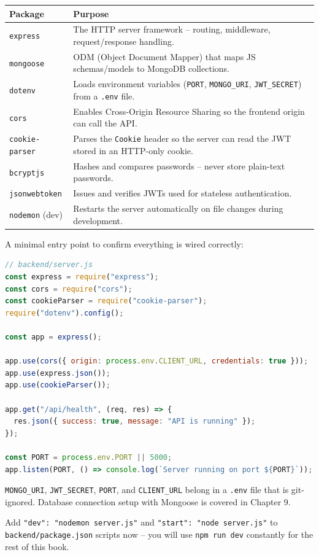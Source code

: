 \begin{table}[h]
\centering
\begin{tabularx}{\textwidth}{lX}
\toprule
\textbf{Package} & \textbf{Purpose} \\
\midrule
\texttt{express} & The HTTP server framework -- routing, middleware, request/response handling. \\
\texttt{mongoose} & ODM (Object Document Mapper) that maps JS schemas/models to MongoDB collections. \\
\texttt{dotenv} & Loads environment variables (\texttt{PORT}, \texttt{MONGO\_URI}, \texttt{JWT\_SECRET}) from a \texttt{.env} file. \\
\texttt{cors} & Enables Cross-Origin Resource Sharing so the frontend origin can call the API. \\
\texttt{cookie-parser} & Parses the \texttt{Cookie} header so the server can read the JWT stored in an HTTP-only cookie. \\
\texttt{bcryptjs} & Hashes and compares passwords -- never store plain-text passwords. \\
\texttt{jsonwebtoken} & Issues and verifies JWTs used for stateless authentication. \\
\texttt{nodemon} (dev) & Restarts the server automatically on file changes during development. \\
\bottomrule
\end{tabularx}
\end{table}

A minimal entry point to confirm everything is wired correctly:

\begin{lstlisting}[language=JavaScript]
// backend/server.js
const express = require("express");
const cors = require("cors");
const cookieParser = require("cookie-parser");
require("dotenv").config();

const app = express();

app.use(cors({ origin: process.env.CLIENT_URL, credentials: true }));
app.use(express.json());
app.use(cookieParser());

app.get("/api/health", (req, res) => {
  res.json({ success: true, message: "API is running" });
});

const PORT = process.env.PORT || 5000;
app.listen(PORT, () => console.log(`Server running on port ${PORT}`));
\end{lstlisting}

\begin{notebox}[NOTE]
\texttt{MONGO\_URI}, \texttt{JWT\_SECRET}, \texttt{PORT}, and \texttt{CLIENT\_URL} belong in a
\texttt{.env} file that is git-ignored. Database connection setup with Mongoose
is covered in Chapter 9.
\end{notebox}

\begin{tipbox}[TIP]
Add \texttt{"dev": "nodemon server.js"} and \texttt{"start": "node server.js"} to
\texttt{backend/package.json} scripts now -- you will use \texttt{npm run dev} constantly
for the rest of this book.
\end{tipbox}
